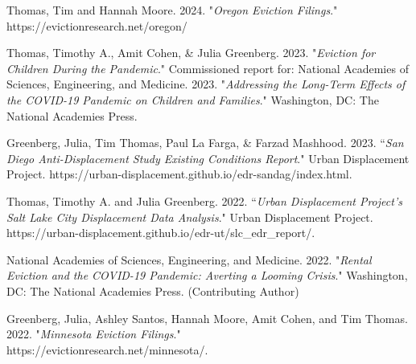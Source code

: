 \begin{cvparagraph}

Thomas, Tim and Hannah Moore. 2024. "\emph{Oregon Eviction Filings}." https://evictionresearch.net/oregon/
\end{cvparagraph}

\begin{cvparagraph}

Thomas, Timothy A., Amit Cohen, \& Julia Greenberg. 2023. "\emph{Eviction for Children During the Pandemic}." Commissioned report for: National Academies of Sciences, Engineering, and Medicine. 2023. "\emph{Addressing the Long-Term Effects of the COVID-19 Pandemic on Children and Families}." Washington, DC: The National Academies Press.
\end{cvparagraph}

\begin{cvparagraph}

Greenberg, Julia, Tim Thomas, Paul La Farga, \& Farzad Mashhood. 2023. “\emph{San Diego Anti-Displacement Study Existing Conditions Report}." Urban Displacement Project. https://urban-displacement.github.io/edr-sandag/index.html.
\end{cvparagraph}

\begin{cvparagraph}

Thomas, Timothy A. and Julia Greenberg. 2022. “\emph{Urban Displacement Project’s Salt Lake City Displacement Data Analysis}." Urban Displacement Project. https://urban-displacement.github.io/edr-ut/slc\_edr\_report/.
\end{cvparagraph}

\begin{cvparagraph}

National Academies of Sciences, Engineering, and Medicine. 2022. "\emph{Rental Eviction and the COVID-19 Pandemic: Averting a Looming Crisis}." Washington, DC: The National Academies Press. (Contributing Author)
\end{cvparagraph}

\begin{cvparagraph}

Greenberg, Julia, Ashley Santos, Hannah Moore, Amit Cohen, and Tim Thomas. 2022. "\emph{Minnesota Eviction Filings}."\\ https://evictionresearch.net/minnesota/.
\end{cvparagraph}

